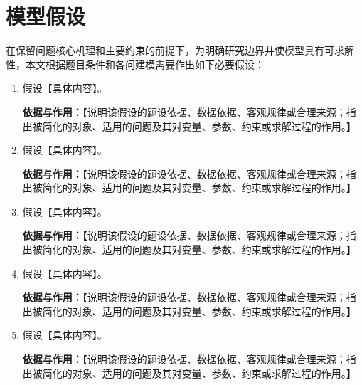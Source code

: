 %

\section{模型假设}

在保留问题核心机理和主要约束的前提下，为明确研究边界并使模型具有可求解性，本文根据题目条件和各问建模需要作出如下必要假设：

\begin{enumerate}
  \setlength{\itemsep}{0.8em}

  \item 假设【具体内容】。

  \textbf{依据与作用：}【说明该假设的题设依据、数据依据、客观规律或合理来源；指出被简化的对象、适用的问题及其对变量、参数、约束或求解过程的作用。】

  \item 假设【具体内容】。

  \textbf{依据与作用：}【说明该假设的题设依据、数据依据、客观规律或合理来源；指出被简化的对象、适用的问题及其对变量、参数、约束或求解过程的作用。】

  \item 假设【具体内容】。

  \textbf{依据与作用：}【说明该假设的题设依据、数据依据、客观规律或合理来源；指出被简化的对象、适用的问题及其对变量、参数、约束或求解过程的作用。】

  \item 假设【具体内容】。

  \textbf{依据与作用：}【说明该假设的题设依据、数据依据、客观规律或合理来源；指出被简化的对象、适用的问题及其对变量、参数、约束或求解过程的作用。】

  \item 假设【具体内容】。

  \textbf{依据与作用：}【说明该假设的题设依据、数据依据、客观规律或合理来源；指出被简化的对象、适用的问题及其对变量、参数、约束或求解过程的作用。】
\end{enumerate}
